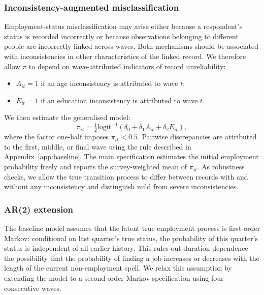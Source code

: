 \subsubsection{Inconsistency-augmented misclassification}\label{subsubsec:inconsistency}

Employment-status misclassification may arise either because a respondent's
status is recorded incorrectly or because observations belonging to different
people are incorrectly linked across waves. Both mechanisms should be associated
with inconsistencies in other characteristics of the linked record. We therefore
allow $\pi$ to depend on wave-attributed indicators of record unreliability:
\begin{itemize}
  \item $A_{it}=1$ if an age inconsistency is attributed to wave $t$;
  \item $E_{it}=1$ if an education inconsistency is attributed to wave $t$.
\end{itemize}
We then estimate the generalised model:
\[
  \pi_{it} = \tfrac{1}{2}\mathrm{logit}^{-1}
  (\delta_0 + \delta_1 A_{it} + \delta_2 E_{it}),
\]
where the factor one-half imposes $\pi_{it}<0.5$. Pairwise discrepancies are
attributed to the first, middle, or final wave using the rule described in
Appendix~\ref{app:baseline}. The main specification estimates the initial
employment probability freely and reports the survey-weighted mean of
$\pi_{it}$. As robustness checks, we allow the true transition process to differ
between records with and without any inconsistency and distinguish mild from
severe inconsistencies.

\subsubsection{AR(2) extension}\label{subsubsec:ar2}

The baseline model assumes that the latent true employment process is
first-order Markov: conditional on last quarter's true status, the probability
of this quarter's status is independent of all earlier history. This rules out
duration dependence---the possibility that the probability of finding a job
increases or decreases with the length of the current non-employment spell.
We relax this assumption by extending the model to a second-order Markov
specification using four consecutive waves.

